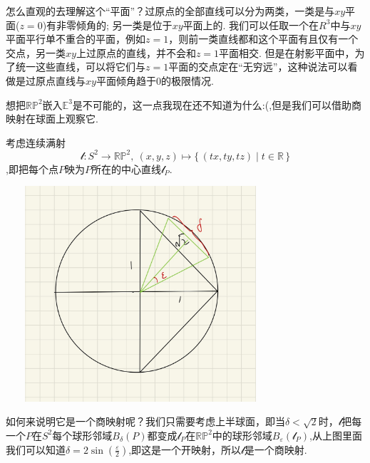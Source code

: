 \documentclass{article}
\newcommand*{\xfunc}[4]{{#2}\colon{#3}{#1}{#4}}
\newcommand*{\func}[3]{\xfunc{\to}{#1}{#2}{#3}}
\newcommand\Set[2]{\{\,#1\mid#2\,\}} %
\begin{document}
怎么直观的去理解这个“平面”？过原点的全部直线可以分为两类，一类是与$xy$平面($z=0$)有非零倾角的; 另一类是位于$xy$平面上的. 我们可以任取一个在$R^3$中与$xy$平面平行单不重合的平面，例如$z=1$，则前一类直线都和这个平面有且仅有一个交点，另一类$xy$上过原点的直线，并不会和$z=1$平面相交. 但是在射影平面中，为了统一这些直线，可以将它们与$z=1$平面的交点定在“无穷远”，这种说法可以看做是过原点直线与$xy$平面倾角趋于0的极限情况.

想把$\mathbb{R}\mathbb{P}^2$嵌入$\mathbb{E}^3$是不可能的，这一点我现在还不知道为什么:(,但是我们可以借助商映射在球面上观察它.

考虑连续满射\[\func{\mathcal{l}}{S^2}{\mathbb{R}\mathbb{P}^2},\ (x,y,z) \mapsto \Set{(tx,ty,tz)}{t \in \mathbb{R}}\],即把每个点$P$映为$P$所在的中心直线$\mathcal{l}_P$.
\begin{center}
\includegraphics[width=10cm, height=8cm]{images/sp2.jpg}
\end{center}

如何来说明它是一个商映射呢？我们只需要考虑上半球面，即当$\delta < \sqrt{2}$时，$\mathcal{l}$把每一个$P$在$S^2$每个球形邻域$B_\delta(P)$都变成$\mathcal{l}_P$在$\mathbb{R}\mathbb{P}^2$中的球形邻域$B_\varepsilon(\mathcal{l}_P)$,从上图里面我们可以知道$\delta=2 \sin(\frac{\varepsilon}{2})$,即这是一个开映射，所以$\mathcal{l}$是一个商映射.
\end{document}
